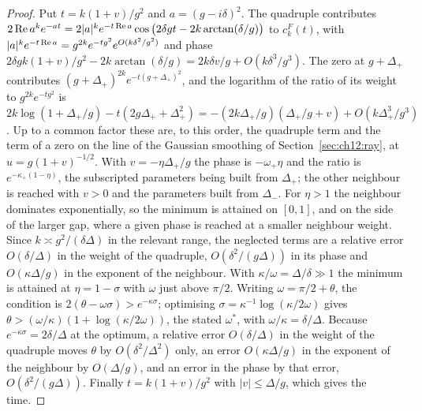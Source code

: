 \begin{proof}
Put $t=k(1+v)/g^2$ and $a=(g-i\delta)^2$. The quadruple contributes $2\operatorname{Re} a^ke^{-at}=2|a|^ke^{-t\operatorname{Re} a}\cos\big(2\delta gt-2k\arctan(\delta/g)\big)$ to $c_k^F(t)$, with $|a|^ke^{-t\operatorname{Re} a}=g^{2k}e^{-tg^2}e^{O(k\delta^2/g^2)}$ and phase $2\delta gk(1+v)/g^2-2k\arctan(\delta/g)=2k\delta v/g+O(k\delta^3/g^3)$. The zero at $g+\Delta_+$ contributes $(g+\Delta_+)^{2k}e^{-t(g+\Delta_+)^2}$, and the logarithm of the ratio of its weight to $g^{2k}e^{-tg^2}$ is $2k\log(1+\Delta_+/g)-t(2g\Delta_++\Delta_+^2)=-(2k\Delta_+/g)(\Delta_+/g+v)+O(k\Delta_+^3/g^3)$. Up to a common factor these are, to this order, the quadruple term and the term of a zero on the line of the Gaussian smoothing of Section~\ref{sec:ch12:ray}, at $u=g(1+v)^{-1/2}$. With $v=-\eta\Delta_+/g$ the phase is $-\omega_+\eta$ and the ratio is $e^{-\kappa_+(1-\eta)}$, the subscripted parameters being built from $\Delta_+$; the other neighbour is reached with $v>0$ and the parameters built from $\Delta_-$. For $\eta>1$ the neighbour dominates exponentially, so the minimum is attained on $[0,1]$, and on the side of the larger gap, where a given phase is reached at a smaller neighbour weight. Since $k\asymp g^2/(\delta\Delta)$ in the relevant range, the neglected terms are a relative error $O(\delta/\Delta)$ in the weight of the quadruple, $O(\delta^2/(g\Delta))$ in its phase and $O(\kappa\Delta/g)$ in the exponent of the neighbour. With $\kappa/\omega=\Delta/\delta\gg1$ the minimum is attained at $\eta=1-\sigma$ with $\omega$ just above $\pi/2$. Writing $\omega=\pi/2+\theta$, the condition is $2(\theta-\omega\sigma)>e^{-\kappa\sigma}$; optimising $\sigma=\kappa^{-1}\log(\kappa/2\omega)$ gives $\theta>(\omega/\kappa)(1+\log(\kappa/2\omega))$, the stated $\omega^*$, with $\omega/\kappa=\delta/\Delta$. Because $e^{-\kappa\sigma}=2\delta/\Delta$ at the optimum, a relative error $O(\delta/\Delta)$ in the weight of the quadruple moves $\theta$ by $O(\delta^2/\Delta^2)$ only, an error $O(\kappa\Delta/g)$ in the exponent of the neighbour by $O(\Delta/g)$, and an error in the phase by that error, $O(\delta^2/(g\Delta))$. Finally $t=k(1+v)/g^2$ with $|v|\le\Delta/g$, which gives the time.
\end{proof}

